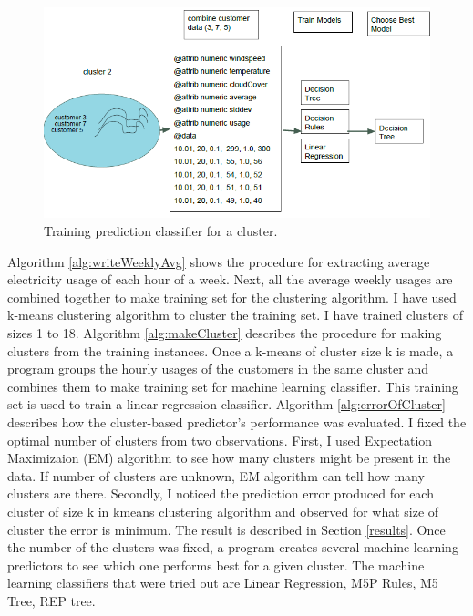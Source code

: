 \begin{figure}[h!]
  \includegraphics[width=\linewidth]{cluster-toy-2.png}
  \caption{Training prediction classifier for a cluster.}
  \label{fig:toy-clust-2}
\end{figure}

Algorithm \ref{alg:writeWeeklyAvg} shows the procedure for extracting average electricity usage of each hour of a week. Next, all the average weekly usages are combined together to make training set for the clustering algorithm. I have used k-means \cite{witten2005data} clustering algorithm to cluster the  training set. I have trained clusters of sizes 1 to 18. Algorithm \ref{alg:makeCluster} describes the procedure for making clusters from the training instances. Once a k-means of cluster size k is made, a program groups the hourly usages of the customers in the same cluster and combines them to make training set for  machine learning classifier. This training set is used to train a  linear regression classifier. Algorithm \ref{alg:errorOfCluster} describes how the cluster-based predictor's performance was evaluated. I fixed the optimal number of clusters from two observations. First, I used Expectation Maximizaion (EM) algorithm to see how many clusters might be present in the data. If number of clusters are unknown, EM algorithm can tell how many clusters are there. Secondly, I noticed the prediction error produced for each cluster of size k in kmeans clustering algorithm and observed for what size of cluster the error is minimum. The result is described in Section \ref{results}. Once the number of the clusters was fixed, a program creates several machine learning predictors to see which one performs best for a given cluster. The machine learning classifiers that were tried out are Linear Regression, M5P Rules, M5 Tree, REP tree\cite{witten2005data}. 


